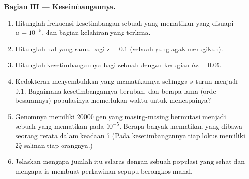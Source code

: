 \begin{problem}
\medskip
\noindent\textbf{Bagian III --- Keseimbangannya.}
\begin{enumerate}[resume]
  \item Hitunglah frekuensi kesetimbangan sebuah   yang
        mematikan yang disuapi $\mu = 10^{-5}$, dan bagian kelahiran
        yang terkena.
  \item Hitunglah hal yang sama bagi $s = 0.1$ (sebuah  
        yang agak merugikan).
  \item Hitunglah kesetimbangannya bagi sebuah   dengan
        kerugian  $hs = 0.05$.
  \item Kedokteran menyembuhkan yang mematikannya sehingga $s$ turun
        menjadi $0.1$. Bagaimana kesetimbangannya berubah, dan berapa
        lama (orde besarannya) populasinya memerlukan waktu untuk
        mencapainya?
  \item Genomnya memiliki \num{20000} gen yang masing-masing bermutasi
        menjadi sebuah   yang mematikan pada $10^{-5}$.
        Berapa banyak  mematikan yang dibawa seorang rerata dalam
        keadaan ? (Pada kesetimbangannya tiap lokus memiliki
        $2\hat q$ salinan tiap orangnya.)
  \item Jelaskan mengapa jumlah itu selaras dengan sebuah populasi yang
        sehat dan mengapa ia membuat perkawinan sepupu berongkos mahal.
\end{enumerate}


\end{problem}
